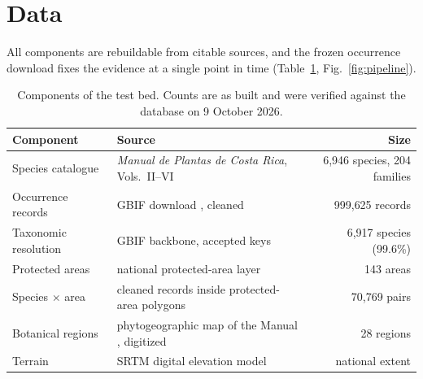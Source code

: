 \documentclass[11pt,a4paper]{article}
\begin{document}
\section{Data}\label{sec:data}

All components are rebuildable from citable sources, and the frozen occurrence
download fixes the evidence at a single point in time (Table~\ref{tab:data},
Fig.~\ref{fig:pipeline}).

\begin{table}[htbp]
\centering
\caption{Components of the test bed. Counts are as built and were verified against
the database on 9 October 2026.}
\label{tab:data}
\small
\begin{tabularx}{\textwidth}{lXr}
\toprule
Component & Source & Size \\
\midrule
Species catalogue      & \emph{Manual de Plantas de Costa Rica}, Vols.\ II--VI \citep{hammel_manual} & 6{,}946 species, 204 families \\
Occurrence records     & GBIF download \citep{gbif_snapshot}, cleaned & 999{,}625 records \\
Taxonomic resolution   & GBIF backbone, accepted keys & 6{,}917 species (99.6\%) \\
Protected areas        & national protected-area layer \citep{snit2024} & 143 areas \\
Species $\times$ area  & cleaned records inside protected-area polygons & 70{,}769 pairs \\
Botanical regions      & phytogeographic map of the Manual \citep{castro_regions}, digitized & 28 regions \\
Terrain                & SRTM digital elevation model \citep{farr2007srtm} & national extent \\
\bottomrule
\end{tabularx}
\end{table}
\end{document}
